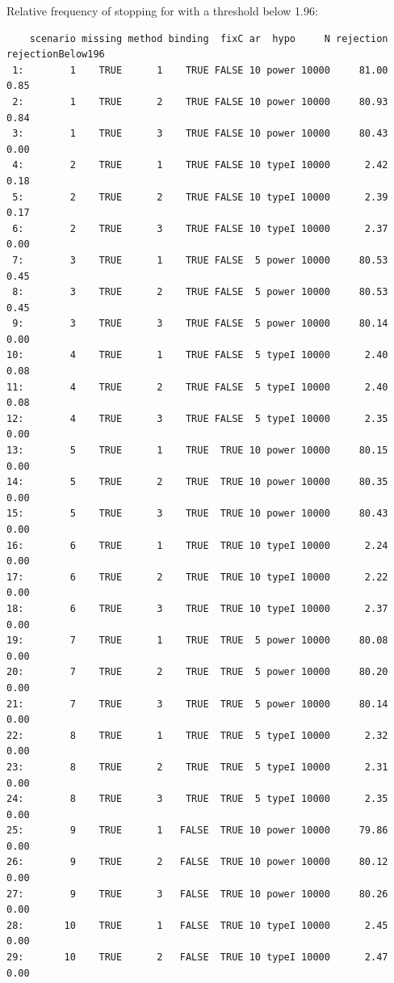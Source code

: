 \documentclass[12pt]{article}
\begin{document}
Relative frequency of stopping for with a threshold below 1.96:
\begin{verbatim}
    scenario missing method binding  fixC ar  hypo     N rejection rejectionBelow196
 1:        1    TRUE      1    TRUE FALSE 10 power 10000     81.00              0.85
 2:        1    TRUE      2    TRUE FALSE 10 power 10000     80.93              0.84
 3:        1    TRUE      3    TRUE FALSE 10 power 10000     80.43              0.00
 4:        2    TRUE      1    TRUE FALSE 10 typeI 10000      2.42              0.18
 5:        2    TRUE      2    TRUE FALSE 10 typeI 10000      2.39              0.17
 6:        2    TRUE      3    TRUE FALSE 10 typeI 10000      2.37              0.00
 7:        3    TRUE      1    TRUE FALSE  5 power 10000     80.53              0.45
 8:        3    TRUE      2    TRUE FALSE  5 power 10000     80.53              0.45
 9:        3    TRUE      3    TRUE FALSE  5 power 10000     80.14              0.00
10:        4    TRUE      1    TRUE FALSE  5 typeI 10000      2.40              0.08
11:        4    TRUE      2    TRUE FALSE  5 typeI 10000      2.40              0.08
12:        4    TRUE      3    TRUE FALSE  5 typeI 10000      2.35              0.00
13:        5    TRUE      1    TRUE  TRUE 10 power 10000     80.15              0.00
14:        5    TRUE      2    TRUE  TRUE 10 power 10000     80.35              0.00
15:        5    TRUE      3    TRUE  TRUE 10 power 10000     80.43              0.00
16:        6    TRUE      1    TRUE  TRUE 10 typeI 10000      2.24              0.00
17:        6    TRUE      2    TRUE  TRUE 10 typeI 10000      2.22              0.00
18:        6    TRUE      3    TRUE  TRUE 10 typeI 10000      2.37              0.00
19:        7    TRUE      1    TRUE  TRUE  5 power 10000     80.08              0.00
20:        7    TRUE      2    TRUE  TRUE  5 power 10000     80.20              0.00
21:        7    TRUE      3    TRUE  TRUE  5 power 10000     80.14              0.00
22:        8    TRUE      1    TRUE  TRUE  5 typeI 10000      2.32              0.00
23:        8    TRUE      2    TRUE  TRUE  5 typeI 10000      2.31              0.00
24:        8    TRUE      3    TRUE  TRUE  5 typeI 10000      2.35              0.00
25:        9    TRUE      1   FALSE  TRUE 10 power 10000     79.86              0.00
26:        9    TRUE      2   FALSE  TRUE 10 power 10000     80.12              0.00
27:        9    TRUE      3   FALSE  TRUE 10 power 10000     80.26              0.00
28:       10    TRUE      1   FALSE  TRUE 10 typeI 10000      2.45              0.00
29:       10    TRUE      2   FALSE  TRUE 10 typeI 10000      2.47              0.00

\end{verbatim}
\end{document}
